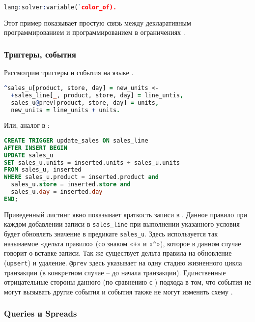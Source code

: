 \begin{lstlisting}[language=Prolog]
lang:solver:variable(`color_of).
\end{lstlisting}

Этот пример показывает простую связь между декларативным программированием и программированием в ограничениях \cite{logiql_vs_datalog}.

\subsubsection{Триггеры, события}
\label{sec:technology:logiql:triggers_events}

Рассмотрим триггеры и события на языке \logiql.

\begin{lstlisting}[language=Prolog]
^sales_u[product, store, day] = new_units <-
  +sales_line[_, product, store, day] = line_untis,
  sales_u@prev[product, store, day] = units,
  new_units = line_units + units.
\end{lstlisting}

Или, аналог в \sql:

\begin{lstlisting}[language=SQL]
CREATE TRIGGER update_sales ON sales_line
AFTER INSERT BEGIN
UPDATE sales_u
SET sales_u.units = inserted.units + sales_u.units
FROM sales_u, inserted
WHERE sales_u.product = inserted.product and
  sales_u.store = inserted.store and
  sales_u.day = inserted.day
END;
\end{lstlisting}

Приведенный листинг явно показывает краткость записи в \logiql. Данное правило при каждом добавлении записи в \lstinline{sales_line} при выполнении указанного условия будет обновлять значение в предикате \lstinline{sales_u}. Здесь используется так называемое «дельта правило» (со знаком «\lstinline{+}» и «\lstinline{^}»), которое в данном случае говорит о вставке записи. Так же существует дельта правила на обновление (\lstinline{upsert}) и удаление. \lstinline{@prev} здесь указывает на одну стадию жизненного цикла транзакции (в конкретном случае – до начала транзакции).
Единственные отрицательные стороны данного (по сравнению с \sql) подхода в том, что события не могут вызывать другие события и события также не могут изменять схему \cite{query_language_for_smart_db}.

\subsubsection{Queries и Spreads}
\label{sec:technology:logiql:queries_spreads}

